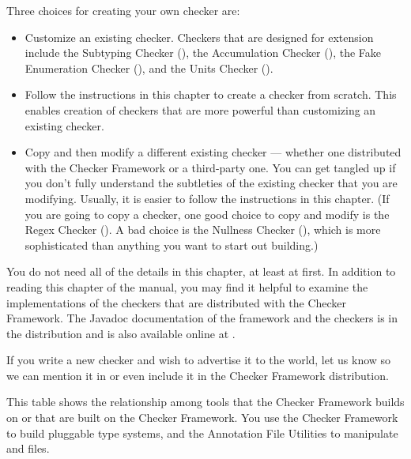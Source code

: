Three choices for creating your own checker are:
\begin{itemize}
\item
  Customize an existing checker.
  Checkers that are designed for extension include
  the Subtyping Checker (),
  the Accumulation Checker (),
  the Fake Enumeration Checker (),
  and the Units Checker ().
\item
  Follow the instructions in this chapter to create a checker from scratch.
  This enables creation of checkers that are more powerful than customizing
  an existing checker.
\item
  Copy and then modify a different existing checker --- whether
  one distributed with the Checker Framework or a third-party one.
  You can get tangled up if you don't fully understand
  the subtleties of the existing checker that you are modifying.
  Usually, it is easier to follow the instructions in this chapter.
  (If you are going to copy a checker, one good choice to copy and modify
  is the Regex Checker ().  A bad choice is
  the Nullness Checker (),
  which is more sophisticated than anything you want to start out building.)
\end{itemize}

You do not need all of the details in this chapter, at least at first.
In addition to reading this chapter of the manual, you may find it helpful
to examine the implementations of the checkers that are distributed with
the Checker Framework.
The Javadoc documentation of the framework and the checkers is in the
distribution and is also available online at
.

If you write a new checker and wish to advertise it to the world, let us
know so we can mention it in 
or even include it in the Checker Framework distribution.



This table shows the relationship among tools that the Checker Framework
builds on or that are built on the Checker Framework.
You use the Checker Framework to build pluggable type systems, and the
Annotation File Utilities to manipulate  and  files.

\newlength{\bw}
\setlength{\bw}{.5in}

